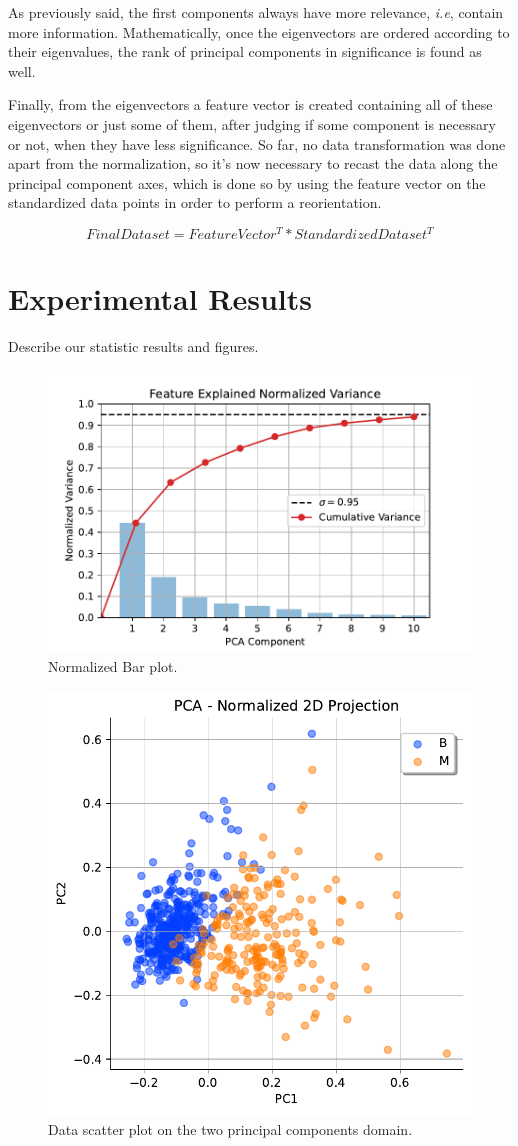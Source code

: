 \documentclass[conference]{IEEEtran}
\newcommand{\reviewUrgent}[1]{{\color{red} #1}} %
\begin{document}
As previously said, the first components always have more relevance, \textit{i.e}, 
contain more information. Mathematically, once the eigenvectors are ordered 
according to their eigenvalues, the rank of principal components in significance is 
found as well.

Finally, from the eigenvectors a feature vector is created containing all of these 
eigenvectors or just some of them, after judging if some component is necessary or 
not, when they have less significance. So far, no data transformation was done apart 
from the normalization, so it's now necessary to recast the data along the principal 
component axes, which is done so by using the feature vector on the standardized 
data points in order to perform a reorientation.

$$FinalDataset = FeatureVector^{T} * StandardizedDataset^{T}$$

\section{Experimental Results}
\reviewUrgent{Describe our statistic results and figures.}

\begin{figure}[htbp]
    \centerline{\includegraphics[width=0.5 \textwidth]{../../code/hw1/figures/5-1-PCA-10PC-variance.pdf}}
    \caption{Normalized Bar plot.}
    \label{fig:5-1-PCA-10PC-variance}
\end{figure}

\begin{figure}[htbp]
    \centerline{\includegraphics[width=0.5 \textwidth]{../../code/hw1/figures/5-2-PCA-2D-scatter.pdf}}
    \caption{Data scatter plot on the two principal components domain.}
    \label{fig:5-2-PCA-2D-scatter}
\end{figure}
\end{document}
